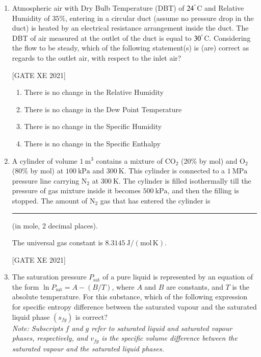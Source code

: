 \documentclass[journal,12pt,onecolumn]{IEEEtran}
\theoremstyle{remark}
\begin{document}
\begin{enumerate}[resume]
\item Atmospheric air with Dry Bulb Temperature (DBT) of $24^\degree$C and Relative Humidity of $35\%$, entering in a circular duct (assume no pressure drop in the duct) is heated by an electrical resistance arrangement inside the duct. The DBT of air measured at the outlet of the duct is equal to $30^\degree$C. Considering the flow to be steady, which of the following statement(s) is (are) correct as regards to the outlet air, with respect to the inlet air?

\hfill[GATE XE 2021]

\begin{multicols}{2}
\begin{enumerate}
\item There is no change in the Relative Humidity
\item There is no change in the Dew Point Temperature
\item There is no change in the Specific Humidity
\item There is no change in the Specific Enthalpy
\end{enumerate}
\end{multicols}


\item A cylinder of volume $1\ \text{m}^3$ contains a mixture of $\text{CO}_2$ (20\% by mol) and $\text{O}_2$ (80\% by mol) at $100\ \text{kPa}$ and $300\ \text{K}$. This cylinder is connected to a $1\ \text{MPa}$ pressure line carrying $\text{N}_2$ at $300\ \text{K}$. The cylinder is filled isothermally till the pressure of gas mixture inside it becomes $500\ \text{kPa}$, and then the filling is stopped. The amount of $\text{N}_2$ gas that has entered the cylinder is \rule{3cm}{0.15mm} (in mole, 2 decimal places).

The universal gas constant is $8.3145\ \text{J}/(\text{mol}\,\text{K})$.

\hfill[GATE XE 2021]


\item The saturation pressure $P_{\text{sat}}$ of a pure liquid is represented by an equation of the form $\ln P_{\text{sat}} = A - (B/T)$, where $A$ and $B$ are constants, and $T$ is the absolute temperature. For this substance, which of the following expression for specific entropy difference between the saturated vapour and the saturated liquid phase $(s_{fg})$ is correct?\\
\emph{Note: Subscripts $f$ and $g$ refer to saturated liquid and saturated vapour phases, respectively, and $v_{fg}$ is the specific volume difference between the saturated vapour and the saturated liquid phases.}


\end{enumerate}
\end{document}
